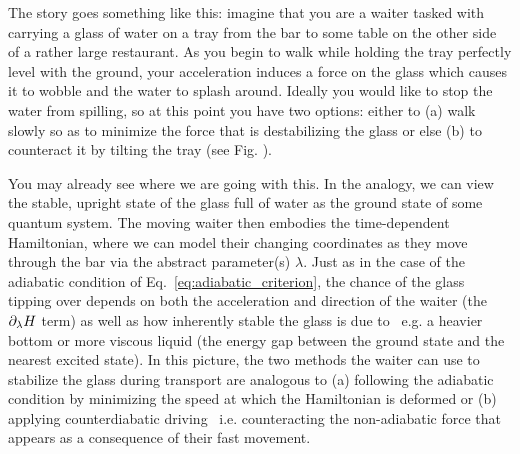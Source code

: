     The story goes something like this: imagine that you are a waiter tasked with carrying a glass of water on a tray from the bar to some table on the other side of a rather large restaurant. As you begin to walk while holding the tray perfectly level with the ground, your acceleration induces a force on the glass which causes it to wobble and the water to splash around. Ideally you would like to stop the water from spilling, so at this point you have two options: either to (a) walk slowly so as to minimize the force that is destabilizing the glass or else (b) to counteract it by tilting the tray (see Fig. ). 

    You may already see where we are going with this. In the analogy, we can view the stable, upright state of the glass full of water as the ground state of some quantum system. The moving waiter then embodies the time-dependent Hamiltonian, where we can model their changing coordinates as they move through the bar via the abstract parameter(s) $\lambda$. Just as in the case of the adiabatic condition of Eq.~\eqref{eq:adiabatic_criterion}, the chance of the glass tipping over depends on both the acceleration and direction of the waiter (the $\partial_{\lambda} H$ term) as well as how inherently stable the glass is due to \@~e.g. a heavier bottom or more viscous liquid (the energy gap between the ground state and the nearest excited state). In this picture, the two methods the waiter can use to stabilize the glass during transport are analogous to (a) following the adiabatic condition by minimizing the speed at which the Hamiltonian is deformed or (b) applying counterdiabatic driving \@~i.e. counteracting the non-adiabatic force that appears as a consequence of their fast movement.
    
